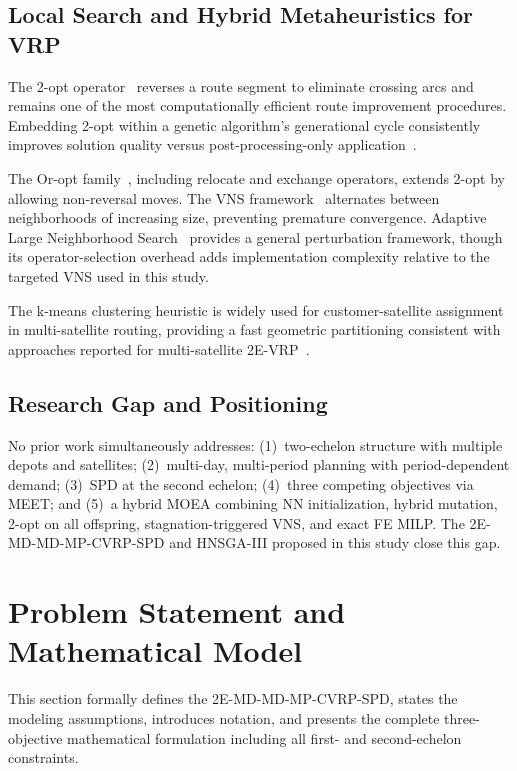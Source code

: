 \documentclass[11pt, a4paper]{article}
\numberwithin{equation}{section}
\begin{document}
\subsection{Local Search and Hybrid Metaheuristics for VRP}

The 2-opt operator~\cite{lin1965} reverses a route segment to eliminate
crossing arcs and remains one of the most computationally efficient route
improvement procedures.  Embedding 2-opt within a genetic algorithm's
generational cycle consistently improves solution quality versus
post-processing-only application~\cite{li2025}.

The Or-opt family~\cite{or1976}, including relocate and exchange operators,
extends 2-opt by allowing non-reversal moves.  The VNS
framework~\cite{hansen2001} alternates between neighborhoods of increasing
size, preventing premature convergence.  Adaptive Large Neighborhood
Search~\cite{ropke2006} provides a general perturbation framework, though its
operator-selection overhead adds implementation complexity relative to the
targeted VNS used in this study.

The k-means clustering heuristic is widely used for customer-satellite
assignment in multi-satellite routing, providing a fast geometric partitioning
consistent with approaches reported for multi-satellite
2E-VRP~\cite{wang2021,wang2023}.

\subsection{Research Gap and Positioning}

No prior work simultaneously addresses: (1)~two-echelon structure with
multiple depots and satellites; (2)~multi-day, multi-period planning with
period-dependent demand; (3)~SPD at the second echelon; (4)~three competing
objectives via MEET; and (5)~a hybrid MOEA combining NN initialization,
hybrid mutation, 2-opt on all offspring, stagnation-triggered VNS, and exact
FE MILP\@.  The 2E-MD-MD-MP-CVRP-SPD and HNSGA-III proposed in this study
close this gap.

\section{Problem Statement and Mathematical Model}
\label{sec:model}

This section formally defines the 2E-MD-MD-MP-CVRP-SPD, states the modeling
assumptions, introduces notation, and presents the complete three-objective
mathematical formulation including all first- and second-echelon constraints.
\end{document}
